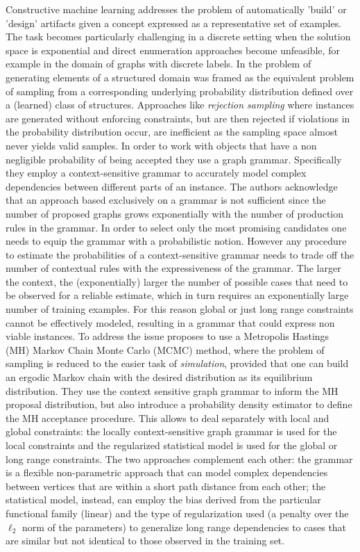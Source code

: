 \documentclass{article}
\begin{document}
Constructive machine learning addresses the problem of automatically 'build'
or 'design' artifacts given a concept expressed as a representative set of
examples. The task becomes particularly challenging in a discrete setting when
the solution space is exponential and direct enumeration approaches become
unfeasible, for example in the domain of graphs with discrete labels. In
\cite{costa16} the problem of generating elements of a structured domain was
framed as the equivalent problem of sampling from a corresponding underlying
probability distribution defined over a (learned) class of structures.
Approaches like {\em rejection sampling} where instances are generated without
enforcing constraints, but are then rejected if violations in the probability
distribution occur, are inefficient as the sampling space almost never yields
valid samples. In order to work with objects that have a non negligible
probability of being accepted they use a graph grammar. Specifically they
employ a context-sensitive grammar to accurately model complex dependencies
between different parts of an instance. The authors acknowledge that an
approach based exclusively on a grammar is not sufficient since the number of
proposed graphs grows exponentially with the number of production rules in the
grammar. In order to select only the most promising candidates one needs to
equip the grammar with a probabilistic notion. However any procedure to
estimate the probabilities of a context-sensitive grammar needs to trade off
the number of contextual rules with the expressiveness of the grammar. The
larger the context, the (exponentially) larger the number of possible cases
that need to be observed for a reliable estimate, which in turn requires an
exponentially large number of training examples. For this reason global or
just long range constraints cannot be effectively modeled, resulting in a
grammar that could express non viable instances. To address the issue
\cite{costa16} proposes to use a Metropolis Hastings (MH) Markov Chain Monte
Carlo (MCMC) method, where the problem of sampling is reduced to the easier
task of {\em simulation}, provided that one can build an ergodic Markov chain
with the desired distribution as its equilibrium distribution. They use the
context sensitive graph grammar to inform the MH proposal distribution, but
also introduce a probability density estimator to define the MH acceptance
procedure. This allows to deal separately with local and global constraints:
the locally context-sensitive graph grammar is used for the local constraints
and the regularized statistical model is used for the global or long range
constraints. The two approaches complement each other: the grammar is a
flexible non-parametric approach that can model complex dependencies between
vertices that are within a short path distance from each other; the
statistical model, instead, can employ the bias derived from the particular
functional family (linear) and the type of regularization used (a penalty over
the $\ell_2$ norm of the parameters) to generalize long range dependencies to
cases that are similar but not identical to those observed in the training
set.
\end{document}
